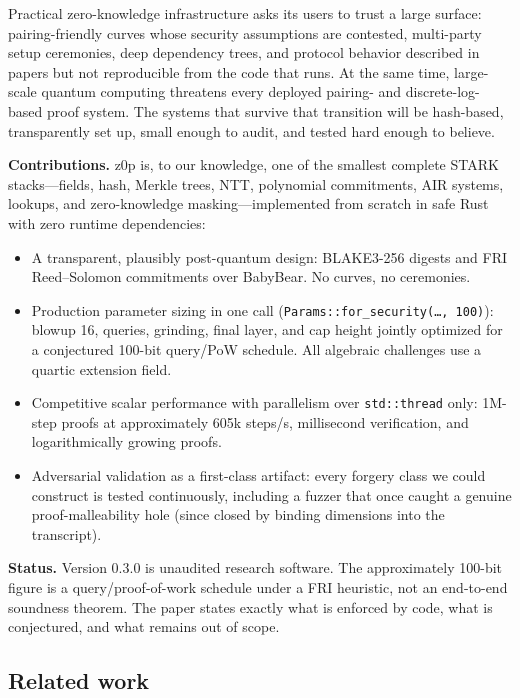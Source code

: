 \documentclass[11pt,a4paper]{article}
\begin{document}
Practical zero-knowledge infrastructure asks its users to trust a large
surface: pairing-friendly curves whose security assumptions are contested,
multi-party setup ceremonies, deep dependency trees, and protocol behavior
described in papers but not reproducible from the code that runs. At the
same time, large-scale quantum computing threatens every deployed
pairing- and discrete-log-based proof system. The systems that survive that
transition will be hash-based, transparently set up, small enough to audit,
and tested hard enough to believe.

\textbf{Contributions.} z0p is, to our knowledge, one of the smallest
complete STARK stacks---fields, hash, Merkle trees, NTT, polynomial
commitments, AIR systems, lookups, and zero-knowledge masking---implemented
from scratch in safe Rust with zero runtime dependencies:
\begin{itemize}[leftmargin=1.2em]
\item A transparent, plausibly post-quantum design: BLAKE3-256 digests and
FRI Reed--Solomon commitments over BabyBear. No curves, no ceremonies.
\item Production parameter sizing in one call
(\texttt{Params::for\_security(\dots, 100)}): blowup 16, queries,
grinding, final layer, and cap height jointly optimized for a conjectured
100-bit query/PoW schedule. All algebraic challenges use a quartic extension
field.
\item Competitive scalar performance with parallelism over
\texttt{std::thread} only: 1M-step proofs at approximately 605k steps/s,
millisecond verification, and logarithmically growing proofs.
\item Adversarial validation as a first-class artifact: every forgery class
we could construct is tested continuously, including a fuzzer that once
caught a genuine proof-malleability hole (since closed by binding dimensions
into the transcript).
\end{itemize}

\textbf{Status.} Version 0.3.0 is unaudited research software. The
approximately 100-bit figure is a query/proof-of-work schedule under a FRI
heuristic, not an end-to-end soundness theorem. The paper states exactly what
is enforced by code, what is conjectured, and what remains out of scope.

\subsection{Related work}
\end{document}
